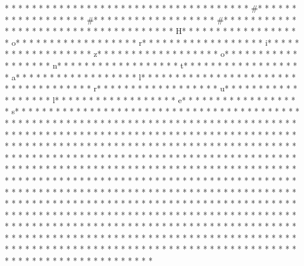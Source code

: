 * * *  * * *  * * *  *  * * *  *  * * *  * 
* * *  * * *  * * *  *  * * *  *  * * *  * #* * *  * * *  * * *  *  * * *  *  * * *  * #* * *  * * *  * * *  *  * * *  *  * * *  * #* * *  * * *  * * *  *  * * *  *  * * *  *  * * *  * * *  * * *  *  * * *  *  * * *  * H* * *  * * *  * * *  *  * * *  *  * * *  * o* * *  * * *  * * *  *  * * *  *  * * *  * r* * *  * * *  * * *  *  * * *  *  * * *  * i* * *  * * *  * * *  *  * * *  *  * * *  * z* * *  * * *  * * *  *  * * *  *  * * *  * o* * *  * * *  * * *  *  * * *  *  * * *  * n* * *  * * *  * * *  *  * * *  *  * * *  * t* * *  * * *  * * *  *  * * *  *  * * *  * a* * *  * * *  * * *  *  * * *  *  * * *  * l* * *  * * *  * * *  *  * * *  *  * * *  *  * * *  * * *  * * *  *  * * *  *  * * *  * r* * *  * * *  * * *  *  * * *  *  * * *  * u* * *  * * *  * * *  *  * * *  *  * * *  * l* * *  * * *  * * *  *  * * *  *  * * *  * e* * *  * * *  * * *  *  * * *  *  * * *  * s* * *  * * *  * * *  *  * * *  *  * * *  * 
* * *  * * *  * * *  *  * * *  *  * * *  * 
* * *  * * *  * * *  *  * * *  *  * * *  * * *  * * *  *  * * *  *  * * *  * * *  * * *  *  * * *  *  * * *  *  * * *  * * *  * * *  *  * * *  *  * * *  *  * * *  * * *  * * *  *  * * *  *  * * *  *  * * *  * * *  * * *  *  * * *  *  * * *  *  * * *  * * *  * * *  *  * * *  *  * * *  *  * * *  * * *  * * *  *  * * *  *  * * *  *  * * *  * * *  * * *  *  * * *  *  * * *  * * *  * * *  *  * * *  *  * * *  * * *  * * *  *  * * *  *  * * *  *  * * *  * * *  * * *  *  * * *  *  * * *  *  * * *  * * *  * * *  *  * * *  *  * * *  *  * * *  * * *  * * *  *  * * *  *  * * *  *  * * *  * * *  * * *  *  * * *  *  * * *  *  * * *  * * *  * * *  *  * * *  *  * * *  *  * * *  * * *  * * *  *  * * *  *  * * *  * * *  * * *  *  * * *  *  * * *  * * *  * * *  *  * * *  *  * * *  *  * * *  * * *  * * *  *  * * *  *  * * *  *  * * *  * * *  * * *  *  * * *  *  * * *  *  * * *  * * *  * * *  *  * * *  *  * * *  *  * * *  * * *  * * *  *  * * *  *  * * *  *  * * *  * * *  * * *  *  * * *  *  * * *  *  * * *  * * *  * * *  *  * * *  *  * * *  * * *  * * *  *  * * *  *  * * *  * * *  * * *  *  * * *  *  * * *  *  * * *  * * *  * * *  *  * * *  *  * * *  *  * * *  * * *  * * *  *  * * *  *  * * *  *  * * *  * * *  * * *  *  * * *  *  * * *  *  * * *  * * *  * * *  *  * * *  *  * * *  *  * * *  * * *  * * *  *  * * *  *  * * *  * 
